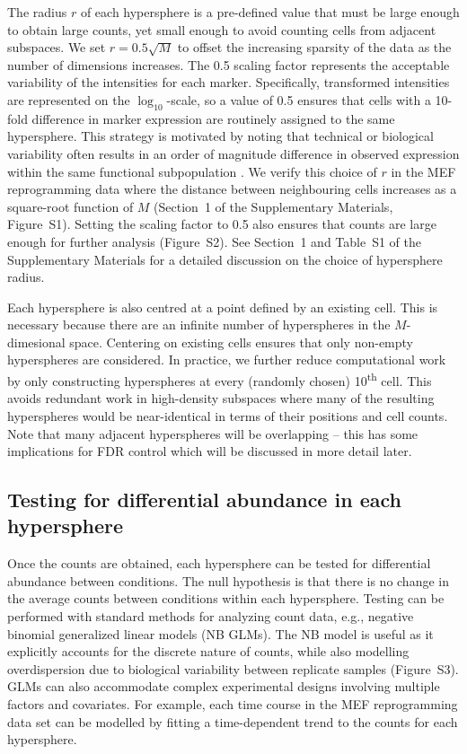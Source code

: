 \documentclass{article}
\newcommand{\supphyperradverify}{1}
\newcommand{\suppfighyperrad}{S1}
\newcommand{\suppfighypertol}{S2}
\newcommand{\suppfignbdisp}{S3}
\newcommand{\supptabparam}{S1}
\begin{document}
The radius $r$ of each hypersphere is a pre-defined value that must be large enough to obtain large counts, yet small enough to avoid counting cells from adjacent subspaces.
We set $r=0.5\sqrt{M}$ to offset the increasing sparsity of the data as the number of dimensions increases.
The 0.5 scaling factor represents the acceptable variability of the intensities for each marker.
Specifically, transformed intensities are represented on the $\log_{10}$-scale, so a value of 0.5 ensures that cells with a 10-fold difference in marker expression are routinely assigned to the same hypersphere.
This strategy is motivated by noting that technical or biological variability often results in an order of magnitude difference in observed expression within the same functional subpopulation \cite{ornatsky2008study,zunder2015continuous,zunder2015palladium}.
We verify this choice of $r$ in the MEF reprogramming data where the distance between neighbouring cells increases as a square-root function of $M$ (Section~\supphyperradverify{} of the Supplementary Materials, Figure~\suppfighyperrad{}).
Setting the scaling factor to 0.5 also ensures that counts are large enough for further analysis (Figure~\suppfighypertol{}).
See Section~\supphyperradverify{} and Table~\supptabparam{} of the Supplementary Materials for a detailed discussion on the choice of hypersphere radius.

Each hypersphere is also centred at a point defined by an existing cell.
This is necessary because there are an infinite number of hyperspheres in the $M$-dimesional space.
Centering on existing cells ensures that only non-empty hyperspheres are considered.
In practice, we further reduce computational work by only constructing hyperspheres at every (randomly chosen) 10\textsuperscript{th} cell.
This avoids redundant work in high-density subspaces where many of the resulting hyperspheres would be near-identical in terms of their positions and cell counts.
Note that many adjacent hyperspheres will be overlapping -- this has some implications for FDR control which will be discussed in more detail later.

\subsection{Testing for differential abundance in each hypersphere}
Once the counts are obtained, each hypersphere can be tested for differential abundance between conditions.
The null hypothesis is that there is no change in the average counts between conditions within each hypersphere.
Testing can be performed with standard methods for analyzing count data, e.g., negative binomial generalized linear models (NB GLMs).
The NB model is useful as it explicitly accounts for the discrete nature of counts, while also modelling overdispersion due to biological variability between replicate samples (Figure~\suppfignbdisp{}).
GLMs can also accommodate complex experimental designs involving multiple factors and covariates.
For example, each time course in the MEF reprogramming data set can be modelled by fitting a time-dependent trend to the counts for each hypersphere.
\end{document}
